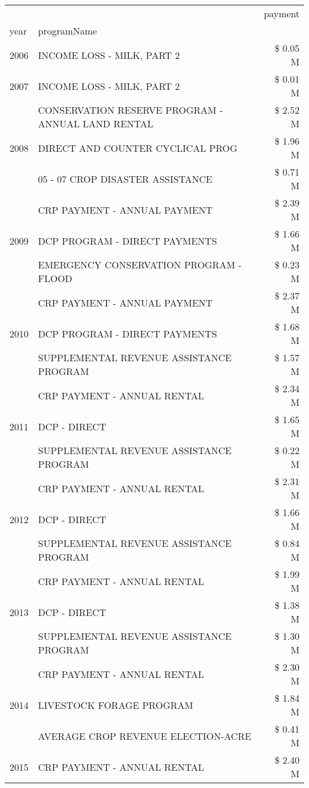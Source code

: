 \begin{tabular}{llr}
\toprule
 &  & payment \\
year & programName &  \\
\midrule
2006 & INCOME LOSS - MILK, PART 2 & \$ 0.05 M \\
\cline{1-3}
2007 & INCOME LOSS - MILK, PART 2 & \$ 0.01 M \\
\cline{1-3}
\multirow[t]{3}{*}{2008} & CONSERVATION RESERVE PROGRAM - ANNUAL LAND RENTAL & \$ 2.52 M \\
 & DIRECT AND COUNTER CYCLICAL PROG & \$ 1.96 M \\
 & 05 - 07 CROP DISASTER ASSISTANCE & \$ 0.71 M \\
\cline{1-3}
\multirow[t]{3}{*}{2009} & CRP PAYMENT - ANNUAL PAYMENT & \$ 2.39 M \\
 & DCP PROGRAM - DIRECT PAYMENTS & \$ 1.66 M \\
 & EMERGENCY CONSERVATION PROGRAM - FLOOD & \$ 0.23 M \\
\cline{1-3}
\multirow[t]{3}{*}{2010} & CRP PAYMENT - ANNUAL PAYMENT & \$ 2.37 M \\
 & DCP PROGRAM - DIRECT PAYMENTS & \$ 1.68 M \\
 & SUPPLEMENTAL REVENUE ASSISTANCE PROGRAM & \$ 1.57 M \\
\cline{1-3}
\multirow[t]{3}{*}{2011} & CRP PAYMENT - ANNUAL RENTAL & \$ 2.34 M \\
 & DCP - DIRECT & \$ 1.65 M \\
 & SUPPLEMENTAL REVENUE ASSISTANCE PROGRAM & \$ 0.22 M \\
\cline{1-3}
\multirow[t]{3}{*}{2012} & CRP PAYMENT - ANNUAL RENTAL & \$ 2.31 M \\
 & DCP - DIRECT & \$ 1.66 M \\
 & SUPPLEMENTAL REVENUE ASSISTANCE PROGRAM & \$ 0.84 M \\
\cline{1-3}
\multirow[t]{3}{*}{2013} & CRP PAYMENT - ANNUAL RENTAL & \$ 1.99 M \\
 & DCP - DIRECT & \$ 1.38 M \\
 & SUPPLEMENTAL REVENUE ASSISTANCE PROGRAM & \$ 1.30 M \\
\cline{1-3}
\multirow[t]{3}{*}{2014} & CRP PAYMENT - ANNUAL RENTAL & \$ 2.30 M \\
 & LIVESTOCK FORAGE PROGRAM & \$ 1.84 M \\
 & AVERAGE CROP REVENUE ELECTION-ACRE & \$ 0.41 M \\
\cline{1-3}
\multirow[t]{2}{*}{2015} & CRP PAYMENT - ANNUAL RENTAL & \$ 2.40 M \\

\end{tabular}
